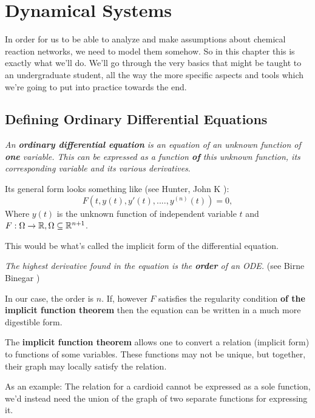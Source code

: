 \chapter{Dynamical Systems}
\label{chap:ch3}

In order for us to be able to analyze and make assumptions about chemical reaction networks, we need to model them somehow. So in this chapter this is exactly what we'll do. We'll go through the very basics that might be taught to an undergraduate student, all the way the more specific aspects and tools which we're going to put into practice towards the end.

\section{Defining Ordinary Differential Equations}
\begin{definition}
	\textit{An \textbf{ordinary differential equation} is an equation of an unknown function of \textbf{one} variable. This can be expressed as a function \textbf{of} this unknown function, its corresponding variable and its various derivatives}.
\end{definition}
Its general form looks something like (see Hunter, John K \cite{hunter2011introduction}):
\begin{equation}\label{ODE}
	F(t,y(t),y'(t),....,y^{(n)}(t))=0,
\end{equation}
Where $y(t)$ is the unknown function of independent variable $t$ and $F : \Omega \rightarrow \mathbb{R},  \\ \Omega \subseteq \mathbb{R}^{n+1}$.

This would be what's called the implicit form of the differential equation.

\begin{definition}
	\textit{The highest derivative found in the equation is the \textbf{order} of an ODE.} (see Birne Binegar \cite{binegar2008})
\end{definition}
In our case, the order is $n$.
If, however $F$ satisfies the regularity condition \textbf{of the implicit function theorem} then the equation can be written in a much more digestible form.

The \textbf{implicit function theorem} allows one to convert a relation (implicit form) to functions of some variables. These functions may not be unique, but together, their graph may locally satisfy the relation.

As an example: The relation for a cardioid cannot be expressed as a sole function, we'd instead need the union of the graph of two separate functions for expressing it.

